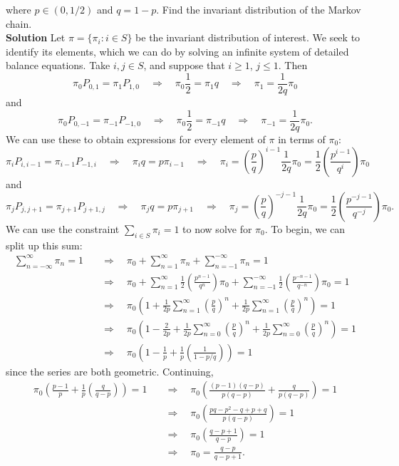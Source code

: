 \documentclass[11pt, letterpaper]{article}
\begin{document}
    where $p\in(0,1/2)$ and $q=1-p$. Find the invariant distribution of the Markov chain.\\[10pt]
    {\bf Solution} Let $\pi=\{\pi_i:i\in S\}$ be the invariant distribution of interest. We seek to identify its elements, which we can do by solving an infinite system of detailed balance equations. Take $i,j\in S$, and suppose that $i\geq 1$, $j\leq 1$. Then
    \[\pi_0P_{0,1}=\pi_1P_{1,0} \quad\Rightarrow\quad \pi_0\frac{1}{2}=\pi_1q\quad\Rightarrow\quad \pi_1=\frac{1}{2q}\pi_0\]
    and
    \[\pi_0P_{0,-1}=\pi_{-1}P_{-1,0} \quad\Rightarrow\quad \pi_0\frac{1}{2}=\pi_{-1}q\quad\Rightarrow\quad \pi_{-1}=\frac{1}{2q}\pi_0.\]
    We can use these to obtain expressions for every element of $\pi$ in terms of $\pi_0$:
    \[\pi_{i}P_{i,i-1}=\pi_{i-1}P_{-1,i}\quad\Rightarrow\quad \pi_{i}q=p\pi_{i-1}\quad\Rightarrow\quad\pi_i=\left(\frac{p}{q}\right)^{i-1}\frac{1}{2q}\pi_0=\frac{1}{2}\left(\frac{p^{i-1}}{q^i}\right)\pi_0\]
    and
    \[\pi_{j}P_{j,j+1}=\pi_{j+1}P_{j+1,j}\quad\Rightarrow\quad \pi_jq=p\pi_{j+1}\quad\Rightarrow\quad\pi_j=\left(\frac{p}{q}\right)^{-j-1}\frac{1}{2q}\pi_0=\frac{1}{2}\left(\frac{p^{-j-1}}{q^{-j}}\right)\pi_0.\]
    We can use the constraint $\sum_{i\in S}\pi_i=1$ to now solve for $\pi_0$. To begin, we can split up this sum:
    \begin{align*}
        \sum_{n=-\infty}^\infty\pi_n=1\quad&\Rightarrow\quad\pi_0+\sum_{n=1}^\infty\pi_n+\sum_{n=-1}^{-\infty}\pi_n=1\\
        &\Rightarrow\quad\pi_0+\sum_{n=1}^\infty\frac{1}{2}\left(\frac{p^{n-1}}{q^n}\right)\pi_0+\sum_{n=-1}^{-\infty}\frac{1}{2}\left(\frac{p^{-n-1}}{q^{-n}}\right)\pi_0=1\\
        &\Rightarrow\quad\pi_0\left(1+\frac{1}{2p}\sum_{n=1}^\infty\left(\frac{p}{q}\right)^n+\frac{1}{2p}\sum_{n=1}^\infty\left(\frac{p}{q}\right)^n\right)=1\\
        &\Rightarrow\quad\pi_0\left(1-\frac{2}{2p}+\frac{1}{2p}\sum_{n=0}^\infty\left(\frac{p}{q}\right)^n+\frac{1}{2p}\sum_{n=0}^\infty\left(\frac{p}{q}\right)^n\right)=1\\
        &\Rightarrow\quad\pi_0\left(1-\frac{1}{p}+\frac{1}{p}\left(\frac{1}{1-p/q}\right)\right)=1
    \end{align*}
    since the series are both geometric. Continuing,
    \begin{align*}
        \pi_0\left(\frac{p-1}{p}+\frac{1}{p}\left(\frac{q}{q-p}\right)\right)=1\quad&\Rightarrow\quad\pi_0\left(\frac{(p-1)(q-p)}{p(q-p)}+\frac{q}{p(q-p)}\right)=1\\
        &\Rightarrow\quad\pi_0\left(\frac{pq-p^2-q+p+q}{p(q-p)}\right)=1\\
        &\Rightarrow\quad\pi_0\left(\frac{q-p+1}{q-p}\right)=1\\
        &\Rightarrow\quad\pi_0=\frac{q-p}{q-p+1}.
    \end{align*}
\end{document}
